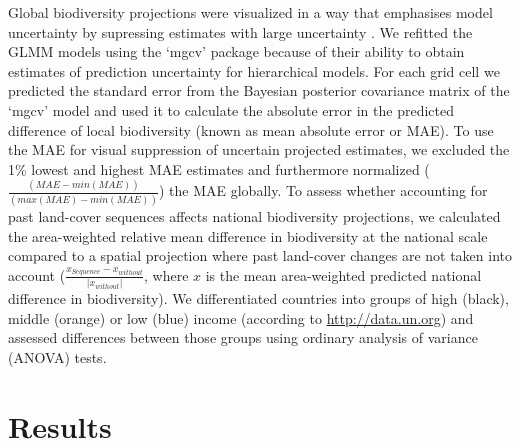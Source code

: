 Global biodiversity projections were visualized in a way that emphasises model uncertainty by supressing estimates with large uncertainty \citep{Correll2018}. We refitted the GLMM models using the ‘mgcv’ package \citep[ver. 1.8-24, ][]{Wood2011} because of their ability to obtain estimates of prediction uncertainty for hierarchical models. For each grid cell we predicted the standard error from the Bayesian posterior covariance matrix of the ‘mgcv’ model \citep{Wood2011} and used it to calculate the absolute error in the predicted difference of local biodiversity (known as mean absolute error or MAE). To use the MAE for visual suppression of uncertain projected estimates, we excluded the 1\% lowest and highest MAE estimates and furthermore normalized ($ \frac{(MAE - min(MAE) )}{(max(MAE) - min(MAE))} $) the MAE globally. To assess whether accounting for past land-cover sequences affects national biodiversity projections, we calculated the area-weighted relative mean difference in biodiversity at the national scale compared to a spatial projection where past land-cover changes are not taken into account ($\frac{x_{Sequence} -x_{without} }{|x_{without}|}$, where $x$ is the mean area-weighted predicted national difference in biodiversity). We differentiated countries into groups of high (black), middle (orange) or low (blue) income (according to \href{http://data.un.org}{http://data.un.org}) and assessed differences between those groups using ordinary analysis of variance (ANOVA) tests.

\section{Results}
\label{C04_03}

